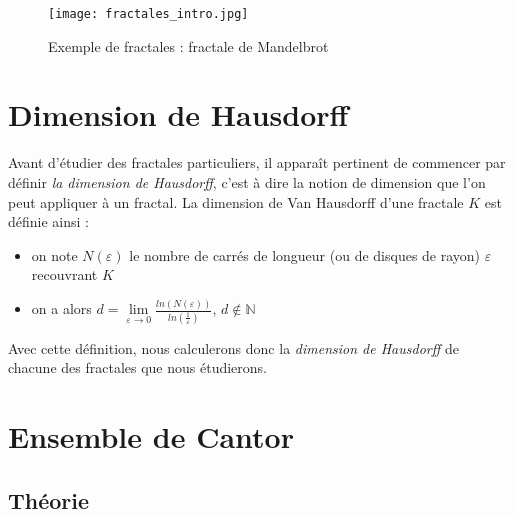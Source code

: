 \documentclass[a4paper,10pt]{report}
\begin{document}
\begin{center}
\begin{figure}[H]
\caption{Exemple de fractales : fractale de Mandelbrot}
\texttt{[image: fractales\_intro.jpg]}
\end{figure}
\end{center}

\section{Dimension de Hausdorff}
Avant d'étudier des fractales particuliers, il apparaît pertinent de commencer par définir \textit{la dimension de Hausdorff}, c'est à dire la notion de dimension que l'on peut appliquer à un fractal. La dimension de Van Hausdorff d'une fractale $K$ est définie ainsi :\\
\begin{itemize}
\item on note $N(\varepsilon)$ le nombre de carrés de longueur (ou de disques de rayon) $\varepsilon$ recouvrant $K$
\item on a alors $d=\lim\limits_{\varepsilon \rightarrow 0} \frac{ln(N(\varepsilon))}{ln(\frac{1}{\varepsilon})}$, $d \notin \mathbb{N}$
\end{itemize}
Avec cette définition, nous calculerons donc la \textit{dimension de Hausdorff} de chacune des fractales que nous étudierons.

\section{Ensemble de Cantor}
\subsection{Théorie}
\end{document}
